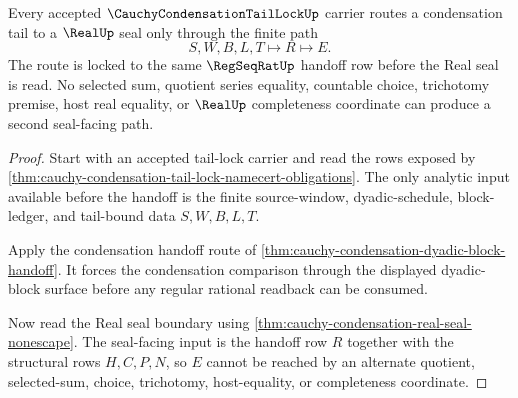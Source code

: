 \begin{theorem}
\label{thm:cauchy-condensation-tail-lock-real-seal-route}
Every accepted $\CauchyCondensationTailLockUp$ carrier routes a condensation tail to a $\RealUp$ seal only through the finite path
$$
S,W,B,L,T \longmapsto R \longmapsto E.
$$
The route is locked to the same $\RegSeqRatUp$ handoff row before the Real seal is read. No selected sum, quotient series equality, countable choice, trichotomy premise, host real equality, or $\RealUp$ completeness coordinate can produce a second seal-facing path.
\end{theorem}
\begin{proof}
Start with an accepted tail-lock carrier and read the rows exposed by \autoref{thm:cauchy-condensation-tail-lock-namecert-obligations}. The only analytic input available before the handoff is the finite source-window, dyadic-schedule, block-ledger, and tail-bound data $S,W,B,L,T$.

Apply the condensation handoff route of \autoref{thm:cauchy-condensation-dyadic-block-handoff}. It forces the condensation comparison through the displayed dyadic-block surface before any regular rational readback can be consumed.

Now read the Real seal boundary using \autoref{thm:cauchy-condensation-real-seal-nonescape}. The seal-facing input is the handoff row $R$ together with the structural rows $H,C,P,N$, so $E$ cannot be reached by an alternate quotient, selected-sum, choice, trichotomy, host-equality, or completeness coordinate.
\end{proof}





